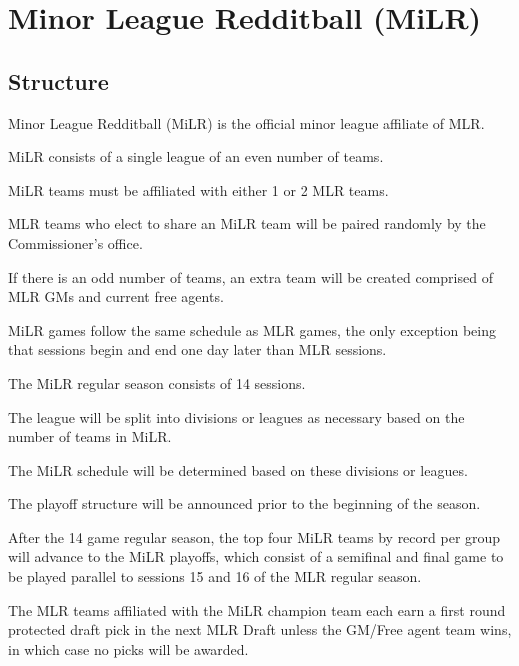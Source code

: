 
\section{Minor League Redditball (MiLR)}

\subsection{Structure}
\begin{deepEnumerate}
	\item Minor League Redditball (MiLR) is the official minor league affiliate of MLR.
	\item MiLR consists of a single league of an even number of teams.
	\begin{deepEnumerate}
        \item MiLR teams must be affiliated with either 1 or 2 MLR teams.
        \begin{deepEnumerate}
            \item MLR teams who elect to share an MiLR team will be paired randomly by the Commissioner's office.
            \item If there is an odd number of teams, an extra team will be created comprised of MLR GMs and current free agents.
        \end{deepEnumerate} 
    \end{deepEnumerate}
	\item MiLR games follow the same schedule as MLR games, the only exception being that sessions begin and end one day later than MLR sessions.
    \item The MiLR regular season consists of 14 sessions. 
    \item The league will be split into divisions or leagues as necessary based on the number of teams in MiLR.
    \begin{deepEnumerate}
        \item The MiLR schedule will be determined based on these divisions or leagues.
        \item The playoff structure will be announced prior to the beginning of the season.
    \end{deepEnumerate}
	\item After the 14 game regular season, the top four MiLR teams by record per group will advance to the MiLR playoffs, 
	which consist of a semifinal and final game to be played parallel to sessions 15 and 16 of the MLR regular season.
	\item The MLR teams affiliated with the MiLR champion team each earn a first round protected draft pick in the next MLR Draft 
	unless the GM/Free agent team wins, in which case no picks will be awarded.
\end{deepEnumerate}


